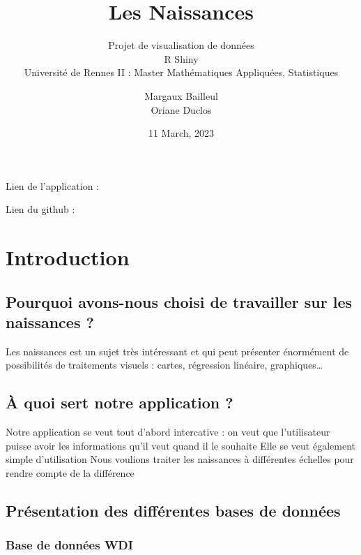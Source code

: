 \documentclass[
]{article}
\title{Les Naissances}
\subtitle{Projet de visualisation de données\\
R Shiny\\
Université de Rennes II : Master Mathématiques Appliquées, Statistiques}
\author{Margaux Bailleul\\
Oriane Duclos}
\date{11 March, 2023}
\begin{document}
\maketitle

{
\setcounter{tocdepth}{2}
\tableofcontents
}
Lien de l'application :

Lien du github :

\hypertarget{introduction}{%
\section{Introduction}\label{introduction}}

\hypertarget{pourquoi-avons-nous-choisi-de-travailler-sur-les-naissances}{%
\subsection{Pourquoi avons-nous choisi de travailler sur les naissances
?}\label{pourquoi-avons-nous-choisi-de-travailler-sur-les-naissances}}

Les naissances est un sujet très intéressant et qui peut présenter
énormément de possibilités de traitements visuels : cartes, régression
linéaire, graphiques\ldots{}

\hypertarget{uxe0-quoi-sert-notre-application}{%
\subsection{À quoi sert notre application
?}\label{uxe0-quoi-sert-notre-application}}

Notre application se veut tout d'abord intercative : on veut que
l'utilisateur puisse avoir les informations qu'il veut quand il le
souhaite Elle se veut également simple d'utilisation Nous voulions
traiter les naissances à différentes échelles pour rendre compte de la
différence

\hypertarget{pruxe9sentation-des-diffuxe9rentes-bases-de-donnuxe9es}{%
\subsection{Présentation des différentes bases de
données}\label{pruxe9sentation-des-diffuxe9rentes-bases-de-donnuxe9es}}

\hypertarget{base-de-donnuxe9es-wdi}{%
\subsubsection{Base de données WDI}\label{base-de-donnuxe9es-wdi}}
\end{document}
